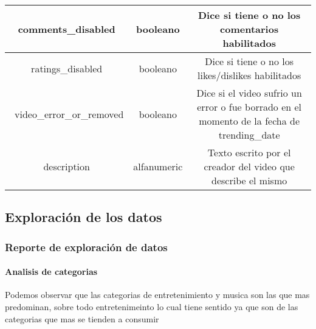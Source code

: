 {\begin{tabular}{||c | c | c||}
            \hline
            comments\_disabled & booleano & Dice si tiene o no los comentarios habilitados \\
            \hline
            ratings\_disabled & booleano & Dice si tiene o no los likes/dislikes habilitados \\
            \hline\
            video\_error\_or\_removed & booleano & Dice si el video sufrio un error o fue borrado en el momento de la fecha de trending\_date \\
            \hline
            description & alfanumeric & Texto escrito por el creador del video que describe el mismo \\
            \hline
        \end{tabular}}
\newpage
\subsection{Exploración de los datos}
    \subsubsection{Reporte de exploración de datos}

        \paragraph{Analisis de categorias}
            \begin{figure}[ht]
            \end{figure}
        \FloatBarrier
        Podemos observar que las categorias de entretenimiento y musica son las
        que mas predominan, sobre todo entretenimeinto lo cual tiene sentido
        ya que son de las categorias que mas se tienden a consumir
        \newpage
